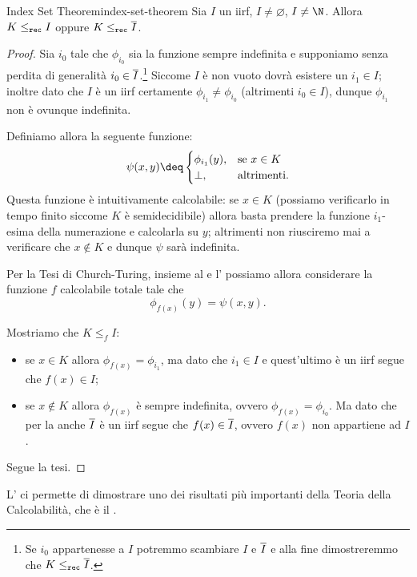 \begin{theorem}
    {Index Set Theorem}{index-set-theorem}
    Sia $I$ un iirf, $I \neq \varnothing$, $I \neq \N$. Allora $K \leq_{\texttt{rec}} I$ oppure $K \leq_{\texttt{rec}} \overline{I}$.   
\end{theorem}
\begin{proof}
    Sia $i_0$ tale che $\phi_{i_0}$ sia la funzione sempre indefinita e supponiamo senza perdita di generalità $i_0 \in \overline{I}$.\footnote{Se $i_0$ appartenesse a $I$ potremmo scambiare $I$ e $\overline{I}$ e alla fine dimostreremmo che $K \leq_{\texttt{rec}} \overline{I}$.} Siccome $I$ è non vuoto dovrà esistere un $i_1 \in I$; inoltre dato che $I$ è un iirf certamente $\phi_{i_1} \neq \phi_{i_0}$ (altrimenti $i_0 \in I$), dunque $\phi_{i_1}$ non è ovunque indefinita.  

    Definiamo allora la seguente funzione: \[
        \psi(x, y) \deq \begin{cases}
            \phi_{i_1}(y),  &\text{se } x \in K\\
            \bot,           &\text{altrimenti.}
        \end{cases}
    \] Questa funzione è intuitivamente calcolabile: se $x \in K$ (possiamo verificarlo in tempo finito siccome $K$ è semidecidibile) allora basta prendere la funzione $i_1$-esima della numerazione e calcolarla su $y$; altrimenti non riusciremo mai a verificare che $x \notin K$ e dunque $\psi$ sarà indefinita.
    
    Per la Tesi di Church-Turing, insieme al  e l' possiamo allora considerare la funzione $f$ calcolabile totale tale che \[
        \phi_{f(x)}(y) = \psi(x, y).
    \]

    Mostriamo che $K \leq_f I$: \begin{itemize}
        \item se $x \in K$ allora $\phi_{f(x)} = \phi_{i_1}$, ma dato che $i_1 \in I$ e quest'ultimo è un iirf segue che $f(x) \in I$;
        \item se $x \notin K$ allora $\phi_{f(x)}$ è sempre indefinita, ovvero $\phi_{f(x)} = \phi_{i_0}$. Ma dato che per la  anche $\overline{I}$ è un iirf segue che $f(x) \in \overline{I}$, ovvero $f(x)$ non appartiene ad $I$.   
    \end{itemize} 
    Segue la tesi.
\end{proof}

L' ci permette di dimostrare uno dei risultati più importanti della Teoria della Calcolabilità, che è il .


